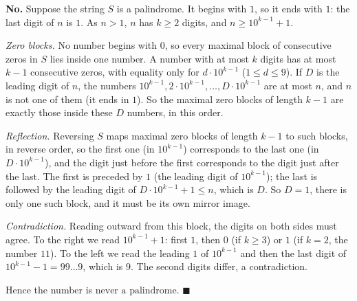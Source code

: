 \textbf{No.} Suppose the string $S$ is a palindrome. It begins with $1$, so it ends with $1$: the last digit of $n$ is $1$. As $n>1$, $n$ has $k\ge2$ digits, and $n\ge10^{k-1}+1$.

\emph{Zero blocks.} No number begins with $0$, so every maximal block of consecutive zeros in $S$ lies inside one number. A number with at most $k$ digits has at most $k-1$ consecutive zeros, with equality only for $d\cdot10^{k-1}$ ($1\le d\le9$). If $D$ is the leading digit of $n$, the numbers $10^{k-1},2\cdot10^{k-1},\dots,D\cdot10^{k-1}$ are at most $n$, and $n$ is not one of them (it ends in $1$). So the maximal zero blocks of length $k-1$ are exactly those inside these $D$ numbers, in this order.

\emph{Reflection.} Reversing $S$ maps maximal zero blocks of length $k-1$ to such blocks, in reverse order, so the first one (in $10^{k-1}$) corresponds to the last one (in $D\cdot10^{k-1}$), and the digit just before the first corresponds to the digit just after the last. The first is preceded by $1$ (the leading digit of $10^{k-1}$); the last is followed by the leading digit of $D\cdot10^{k-1}+1\le n$, which is $D$. So $D=1$, there is only one such block, and it must be its own mirror image.

\emph{Contradiction.} Reading outward from this block, the digits on both sides must agree. To the right we read $10^{k-1}+1$: first $1$, then $0$ (if $k\ge3$) or $1$ (if $k=2$, the number $11$). To the left we read the leading $1$ of $10^{k-1}$ and then the last digit of $10^{k-1}-1=99\ldots9$, which is $9$. The second digits differ, a contradiction.

Hence the number is $\boxed{\text{never a palindrome}}$. $\blacksquare$

